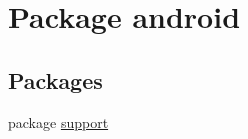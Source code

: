 \hypertarget{namespaceandroid}{}\section{Package android}
\label{namespaceandroid}
\subsection*{Packages}
\begin{DoxyCompactItemize}
\item 
package \hyperlink{namespaceandroid_1_1support}{support}
\end{DoxyCompactItemize}

